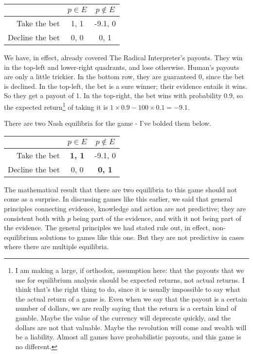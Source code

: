 \begin{center}
\begin{tabular}{r | c c}
& $p \in E$ & $p \notin E$ \\ \hline
Take the bet & 1, 1 & -9.1, 0 \\
Decline the bet & 0, 0 & 0, 1
\end{tabular}
\end{center}
We have, in effect, already covered The Radical Interpreter's payouts. They win in the top-left and lower-right quadrants, and lose otherwise. Human's payouts are only a little trickier. In the bottom row, they are guaranteed 0, since the bet is declined. In the top-left, the bet is a sure winner; their evidence entails it wins. So they get a payout of 1. In the top-right, the bet wins with probability 0.9, so the expected return\footnote{I am making a large, if orthodox, assumption here: that the payouts that we use for equilibrium analysis should be expected returns, not actual returns. I think that's the right thing to do, since it is usually impossible to say what the actual return of a game is. Even when we say that the payout is a certain number of dollars, we are really saying that the return is a certain kind of gamble. Maybe the value of the currency will deprecate quickly, and the dollars are not that valuable. Maybe the revolution will come and wealth will be a liability. Almost all games have probabilistic payouts, and this game is no different.} of taking it is $1 \times 0.9 - 100 \times 0.1 = -9.1$.

There are two Nash equilibria for the game - I've bolded them below.

\begin{center}
\begin{tabular}{r | c c}
& $p \in E$ & $p \notin E$ \\ \hline
Take the bet & \textbf{1, 1} & -9.1, 0 \\
Decline the bet & 0, 0 & \textbf{0, 1}
\end{tabular}
\end{center}
The mathematical result that there are two equilibria to this game should not come as a surprise. In discussing games like this earlier, we said that general principles connecting evidence, knowledge and action are not predictive; they are consistent both with \emph{p} being part of the evidence, and with it not being part of the evidence. The general principles we had stated rule out, in effect, non-equilibrium solutions to games like this one. But they are not predictive in cases where there are multiple equilibria. 

